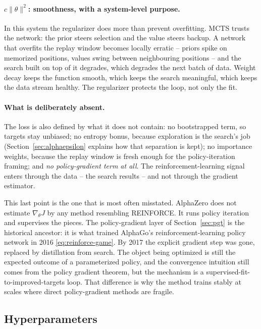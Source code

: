 \paragraph{$c\|\theta\|^2$: smoothness, with a system-level purpose.} In this
system the regularizer does more than prevent overfitting. MCTS trusts the
network: the prior steers selection and the value steers backup. A network that
overfits the replay window becomes locally erratic -- priors spike on memorized
positions, values swing between neighbouring positions -- and the search built on
top of it degrades, which degrades the next batch of data. Weight decay keeps the
function smooth, which keeps the search meaningful, which keeps the data stream
healthy. The regularizer protects the loop, not only the fit.

\paragraph{What is deliberately absent.} The loss is also defined by what it does
not contain: no bootstrapped term, so targets stay unbiased; no entropy bonus,
because exploration is the search's job
(Section~\ref{sec:alphaepsilon} explains how that separation is kept); no
importance weights, because the replay window is fresh enough for the
policy-iteration framing; and \emph{no policy-gradient term at all}. The
reinforcement-learning signal enters through the data -- the search results --
and not through the gradient estimator.

This last point is the one that is most often misstated. AlphaZero does not
estimate $\nabla_\theta J$ by any method resembling REINFORCE. It runs policy
iteration and supervises the pieces. The policy-gradient layer of
Section~\ref{sec:pgt} is the historical ancestor: it is what trained AlphaGo's
reinforcement-learning policy network in 2016 \eqref{eq:reinforce-game}. By 2017
the explicit gradient step was gone, replaced by distillation from search. The
object being optimized is still the expected outcome of a parameterized policy,
and the convergence intuition still comes from the policy gradient theorem, but
the mechanism is a supervised-fit-to-improved-targets loop. That difference is
why the method trains stably at scales where direct policy-gradient methods are
fragile.

\subsection{Hyperparameters}
\label{sec:hyper}

